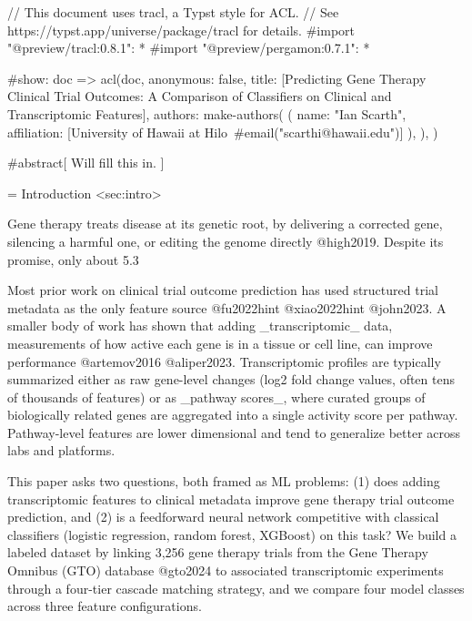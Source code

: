 // This document uses tracl, a Typst style for ACL.
// See https://typst.app/universe/package/tracl for details.
#import "@preview/tracl:0.8.1": *
#import "@preview/pergamon:0.7.1": *

#show: doc => acl(doc,
  anonymous: false,
  title: [Predicting Gene Therapy Clinical Trial Outcomes: A Comparison of Classifiers on Clinical and Transcriptomic Features],
  authors: make-authors(
    (
      name: "Ian Scarth",
      affiliation: [University of Hawaii at Hilo\ #email("scarthi@hawaii.edu")]
    ),
  ),
)

#abstract[
  Will fill this in.
]

= Introduction <sec:intro>

Gene therapy treats disease at its genetic root, by delivering a corrected gene, silencing a harmful one, or editing the genome directly @high2019. Despite its promise, only about 5.3%

Most prior work on clinical trial outcome prediction has used structured trial metadata as the only feature source @fu2022hint @xiao2022hint @john2023. A smaller body of work has shown that adding _transcriptomic_ data, measurements of how active each gene is in a tissue or cell line, can improve performance @artemov2016 @aliper2023. Transcriptomic profiles are typically summarized either as raw gene-level changes (log2 fold change values, often tens of thousands of features) or as _pathway scores_, where curated groups of biologically related genes are aggregated into a single activity score per pathway. Pathway-level features are lower dimensional and tend to generalize better across labs and platforms.

This paper asks two questions, both framed as ML problems: (1) does adding transcriptomic features to clinical metadata improve gene therapy trial outcome prediction, and (2) is a feedforward neural network competitive with classical classifiers (logistic regression, random forest, XGBoost) on this task? We build a labeled dataset by linking 3,256 gene therapy trials from the Gene Therapy Omnibus (GTO) database @gto2024 to associated transcriptomic experiments through a four-tier cascade matching strategy, and we compare four model classes across three feature configurations.

